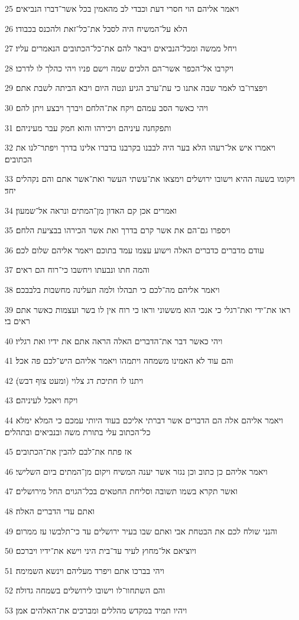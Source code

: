 \par 25 ויאמר אליהם הוי חסרי דעת וכבדי לב מהאמין בכל אשר־דברו הנביאים׃
\par 26 הלא על־המשיח היה לסבל את־כל־זאת ולהכנס בכבודו׃
\par 27 ויחל ממשה ומכל־הנביאים ויבאר להם את־כל־הכתובים הנאמרים עליו׃
\par 28 ויקרבו אל־הכפר אשר־הם הלכים שמה וישם פניו ויהי כהלך לו לדרכו׃
\par 29 ויפצרו־בו לאמר שבה אתנו כי עת־ערב הגיע ונטה היום ויבא הביתה לשבת אתם׃
\par 30 ויהי כאשר הסב עמהם ויקח את־הלחם ויברך ויבצע ויתן להם׃
\par 31 ותפקחנה עיניהם ויכירהו והוא חמק עבר מעיניהם׃
\par 32 ויאמרו איש אל־רעהו הלא בער היה לבבנו בקרבנו בדברו אלינו בדרך ויפתר־לנו את הכתובים׃
\par 33 ויקומו בשעה ההיא וישובו ירושלים וימצאו את־עשתי העשר ואת־אשר אתם והם נקהלים יחד׃
\par 34 ואמרים אכן קם האדון מן־המתים ונראה אל־שמעון׃
\par 35 ויספרו גם־הם את אשר קרם בדרך ואת אשר הכירהו בבציעת הלחם׃
\par 36 עודם מדברים כדברים האלה וישוע עצמו עמד בתוכם ויאמר אליהם שלום לכם׃
\par 37 והמה חתו ונבעתו ויחשבו כי־רוח הם ראים׃
\par 38 ויאמר אליהם מה־לכם כי תבהלו ולמה תעלינה מחשבות בלבבכם׃
\par 39 ראו את־ידי ואת־רגלי כי אנכי הוא מששוני וראו כי רוח אין לו בשר ועצמות כאשר אתם ראים בי׃
\par 40 ויהי כאשר דבר את־הדברים האלה הראה אתם את ידיו ואת רגליו׃
\par 41 והם עוד לא האמינו משמחה ויתמהו ויאמר אליהם היש־לכם פה אכל׃
\par 42 ויתנו לו חתיכת דג צלוי (ומעט צוף דבש)׃
\par 43 ויקח ויאכל לעיניהם׃
\par 44 ויאמר אליהם אלה הם הדברים אשר דברתי אליכם בעוד היותי עמכם כי המלא ימלא כל־הכתוב עלי בתורת משה ובנביאים ובתהלים׃
\par 45 אז פתח את־לבם להבין את־הכתובים׃
\par 46 ויאמר אליהם כן כתוב וכן נגזר אשר יענה המשיח ויקום מן־המתים ביום השלישי׃
\par 47 ואשר תקרא בשמו תשובה וסליחת החטאים בכל־הגוים החל מירושלים׃
\par 48 ואתם עדי הדברים האלה׃
\par 49 והנני שולח לכם את הבטחת אבי ואתם שבו בעיר ירושלים עד כי־תלבשו עז ממרום׃
\par 50 ויוציאם אל־מחוץ לעיר עד־בית היני וישא את־ידיו ויברכם׃
\par 51 ויהי בברכו אתם ויפרד מעליהם וינשא השמימה׃
\par 52 והם השתחוו־לו וישובו לירושלים בשמחה גדולה׃
\par 53 ויהיו תמיד במקדש מהללים ומברכים את־האלהים אמן׃



